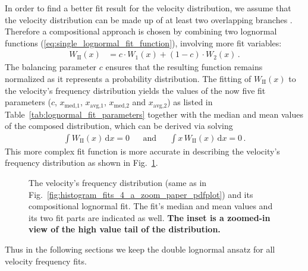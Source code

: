 In order to find a better fit result for the velocity distribution, we assume that the velocity distribution can be made up of at least two overlapping branches \citep{McGregor2011b}. Therefore a compositional approach  is chosen by combining two lognormal functions (\ref{eq:single_lognormal_fit_function}), involving more fit variables:
\begin{align}
	W_\text{II}(x) &= c \cdot W_1(x) + (1 -c) \cdot W_2(x)\,.	\label{eq:double_lognormal_fit_function}
\end{align}
The balancing parameter $c$ ensures that the resulting function remains normalized as it represents a probability distribution.
The fitting of $W_\text{II}(x)$ to the velocity's frequency distribution yields the values of the now five fit parameters ($c$, $x_\text{med,1}$, $x_\text{avg,1}$, $x_\text{med,2}$ and $x_\text{avg,2}$) as listed in Table~\ref{tab:lognormal_fit_parameters} together with the median and mean values of the composed distribution, which can be derived via solving
\begin{align}
	\int W_\text{II}(x)\,\text{d}x = 0	&	&\text{and}	&	&\int x\,W_\text{II}(x)\,\text{d}x = 0	\,.
\end{align}
This more complex fit function is more accurate in describing the velocity's frequency distribution as shown in Fig.~\ref{fig:histogram_fits_V_a_zoom_dbl_paper_pdfplot}.
\begin{figure}
	\caption{The velocity's frequency distribution (same as in Fig.~\ref{fig:histogram_fits_4_a_zoom_paper_pdfplot}) and its compositional lognormal fit. The fit's median and mean values and its two fit parts are indicated as well. \textbf{The inset is a zoomed-in view of the high value tail of the distribution. } }
	\label{fig:histogram_fits_V_a_zoom_dbl_paper_pdfplot}
\end{figure}
Thus in the following sections we keep the double lognormal ansatz for all velocity frequency fits.


